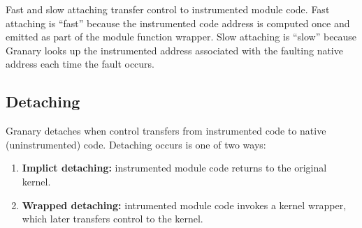 \documentclass[preprint]{sigplanconf}
\begin{document}
Fast and slow attaching transfer control to instrumented module code. Fast attaching is ``fast'' because the instrumented code address is computed once and emitted as part of the module function wrapper. Slow attaching is ``slow'' because Granary looks up the instrumented address associated with the faulting native address each time the fault occurs.

\subsection{Detaching}

Granary detaches when control transfers from instrumented code to native (uninstrumented) code. Detaching occurs is one of two ways: \begin{enumerate}
	\item {\bf Implict detaching:} instrumented module code returns to the original kernel.
	\item {\bf Wrapped detaching:} intrumented module code invokes a kernel wrapper, which later transfers control to the kernel.
\end{enumerate}




\end{document}
